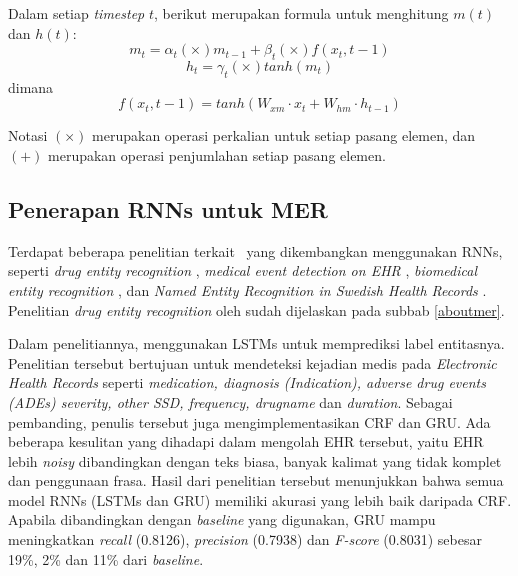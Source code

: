 Dalam setiap \textit{timestep} $ t $, berikut merupakan formula untuk menghitung $ m(t) $ dan $ h(t) $:
\begin{equation}\label{eq:mt}
m_{t}=\alpha_{t} (\times) m_{t-1} + \beta_{t} (\times) f(x_{t},{t-1})
\end{equation}
\begin{equation}\label{eq:ht}
h_{t}=\gamma_{t} (\times) tanh(m_{t})
\end{equation}
dimana
\begin{equation}\label{eq:hf}
f(x_{t},{t-1})=tanh(W_{xm} \cdot x_{t} + W_{hm} \cdot h_{t-1})
\end{equation}

Notasi $ (\times) $ merupakan operasi perkalian untuk setiap pasang elemen, dan $ (+) $ merupakan operasi penjumlahan setiap pasang elemen.

\subsection{Penerapan RNNs untuk MER}
Terdapat beberapa penelitian terkait \mer~yang dikembangkan menggunakan RNNs, seperti \textit{drug entity recognition} \citep{mujiono2016new}, \textit{medical event detection on EHR} \citep{jagannatha2016bidirectional}, \textit{biomedical entity recognition} \citep{limsopatham2016learning}, dan \textit{Named Entity Recognition in Swedish Health Records} \citep{almgren2016named}. Penelitian \textit{drug entity recognition} oleh \cite{mujiono2016new} sudah dijelaskan pada subbab \ref{aboutmer}.

Dalam penelitiannya, \cite{jagannatha2016bidirectional} menggunakan LSTMs untuk memprediksi label entitasnya. Penelitian tersebut bertujuan untuk mendeteksi kejadian medis pada \textit{Electronic Health Records} seperti \textit{medication, diagnosis (Indication), adverse drug events (ADEs) severity, other SSD, frequency, drugname} dan \textit{duration}. Sebagai pembanding, penulis tersebut juga mengimplementasikan CRF dan GRU. Ada beberapa kesulitan yang dihadapi dalam mengolah EHR tersebut, yaitu EHR lebih \textit{noisy} dibandingkan dengan teks biasa, banyak kalimat yang tidak komplet dan penggunaan frasa. Hasil dari penelitian tersebut menunjukkan bahwa semua model RNNs (LSTMs dan GRU) memiliki akurasi yang lebih baik daripada CRF. Apabila dibandingkan dengan \textit{baseline} yang digunakan, GRU mampu meningkatkan \textit{recall} (0.8126), \textit{precision} (0.7938) dan \textit{F-score} (0.8031) sebesar 19\%, 2\% dan 11\% dari \textit{baseline}.

